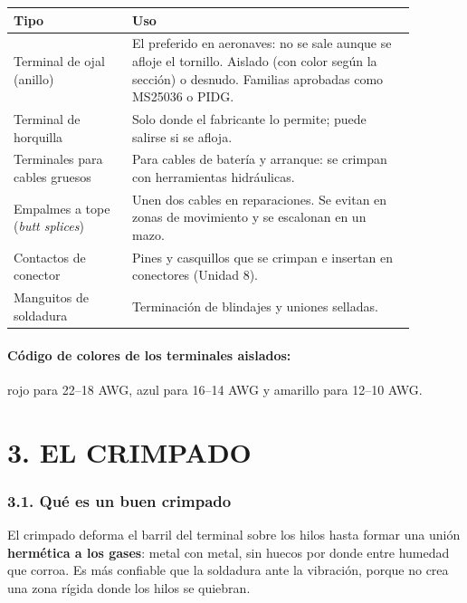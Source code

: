 \begin{center}
\small
\begin{tabular}{|p{0.26\linewidth}|p{0.62\linewidth}|}
\hline
\textbf{Tipo} & \textbf{Uso} \\ \hline
Terminal de ojal (anillo) & El preferido en aeronaves: no se sale aunque se afloje el tornillo.
Aislado (con color según la sección) o desnudo. Familias aprobadas como MS25036 o PIDG. \\ \hline
Terminal de horquilla & Solo donde el fabricante lo permite; puede salirse si se afloja. \\ \hline
Terminales para cables gruesos & Para cables de batería y arranque: se crimpan con herramientas
hidráulicas. \\ \hline
Empalmes a tope (\textit{butt splices}) & Unen dos cables en reparaciones. Se evitan en zonas de
movimiento y se escalonan en un mazo. \\ \hline
Contactos de conector & Pines y casquillos que se crimpan e insertan en conectores (Unidad 8). \\
\hline
Manguitos de soldadura & Terminación de blindajes y uniones selladas. \\ \hline
\end{tabular}
\end{center}

\paragraph*{Código de colores de los terminales aislados:} rojo para 22--18 AWG, azul para 16--14
AWG y amarillo para 12--10 AWG.

\section*{3. EL CRIMPADO}

\subsubsection*{3.1. Qué es un buen crimpado}
El crimpado deforma el barril del terminal sobre los hilos hasta formar una unión \textbf{hermética
a los gases}: metal con metal, sin huecos por donde entre humedad que corroa. Es más confiable que
la soldadura ante la vibración, porque no crea una zona rígida donde los hilos se quiebran.

